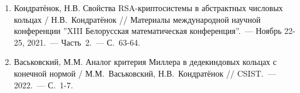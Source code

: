 \begin{enumerate}
    \item \label{source:XIII_Belarussian_math_conference_2021}
    Кондратёнок, Н.В. Свойства RSA-криптосистемы в абстрактных числовых кольцах / Н.В.~Кондратёнок // Материалы международной научной конференции ''XIII Белорусская математическая конференция''.~--- Ноябрь 22-25, 2021.~--- Часть~2.~--- С.~63-64.

    \item \label{source:CSIST_2022}
    Васьковский, М.М. Аналог критерия Миллера в дедекиндовых кольцах с конечной нормой / М.М.~Васьковский, Н.В.~Кондратёнок // CSIST.~--- 2022.~--- С.~1-7.

\end{enumerate}

